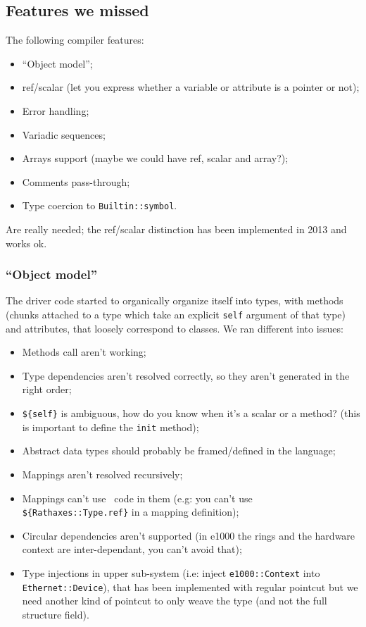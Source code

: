 \documentclass[american]{rtxarticle}
\begin{document}
\subsection{Features we missed}

The following compiler features:

\begin{itemize}
\item ``Object model'';
\item ref/scalar (let you express whether a variable or attribute is a pointer
      or not);
\item Error handling;
\item Variadic sequences;
\item Arrays support (maybe we could have ref, scalar and array?);
\item Comments pass-through;
\item Type coercion to \texttt{Builtin::symbol}.
\end{itemize}

Are really needed; the ref/scalar distinction has been implemented in 2013 and
works ok.

\subsubsection{``Object model''}

The driver code started to organically organize itself into types, with methods
(chunks attached to a type which take an explicit \texttt{self} argument of
that type) and attributes, that loosely correspond to classes. We ran different
into issues:

\begin{itemize}
\item Methods call aren't working;
\item Type dependencies aren't resolved correctly, so they aren't generated in
      the right order;
\item \texttt{\$\{self\}} is ambiguous, how do you know when it's a scalar or a
      method? (this is important to define the \texttt{init} method);
\item Abstract data types should probably be framed/defined in the language;
\item Mappings aren't resolved recursively;
\item Mappings can't use \rtx\ code in them (e.g: you can't use
      \texttt{\$\{Rathaxes::Type.ref\}} in a mapping definition);
\item Circular dependencies aren't supported (in e1000 the rings and the
      hardware context are inter-dependant, you can't avoid that);
\item Type injections in upper sub-system (i.e: inject \texttt{e1000::Context}
      into \texttt{Ethernet::Device}), that has been implemented with regular
      pointcut but we need another kind of pointcut to only weave the type (and
      not the full structure field).
\end{itemize}
\end{document}
